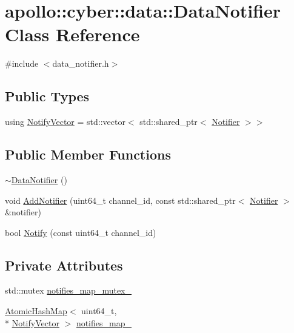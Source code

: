 \hypertarget{classapollo_1_1cyber_1_1data_1_1DataNotifier}{\section{apollo\-:\-:cyber\-:\-:data\-:\-:Data\-Notifier Class Reference}
\label{classapollo_1_1cyber_1_1data_1_1DataNotifier}
}


{\ttfamily \#include $<$data\-\_\-notifier.\-h$>$}

\subsection*{Public Types}
\begin{DoxyCompactItemize}
\item 
using \hyperlink{classapollo_1_1cyber_1_1data_1_1DataNotifier_a32a6a858ae70632d5a6533fb1f16ed2a}{Notify\-Vector} = std\-::vector$<$ std\-::shared\-\_\-ptr$<$ \hyperlink{structapollo_1_1cyber_1_1data_1_1Notifier}{Notifier} $>$$>$
\end{DoxyCompactItemize}
\subsection*{Public Member Functions}
\begin{DoxyCompactItemize}
\item 
\hyperlink{classapollo_1_1cyber_1_1data_1_1DataNotifier_ae1b83ee9238a49eb78876ed5da759c8f}{$\sim$\-Data\-Notifier} ()
\item 
void \hyperlink{classapollo_1_1cyber_1_1data_1_1DataNotifier_a7d08646b3ac8758b2021d24bbc7dabb8}{Add\-Notifier} (uint64\-\_\-t channel\-\_\-id, const std\-::shared\-\_\-ptr$<$ \hyperlink{structapollo_1_1cyber_1_1data_1_1Notifier}{Notifier} $>$ \&notifier)
\item 
bool \hyperlink{classapollo_1_1cyber_1_1data_1_1DataNotifier_a28ae002832e1c7c35a26888b0b5417f9}{Notify} (const uint64\-\_\-t channel\-\_\-id)
\end{DoxyCompactItemize}
\subsection*{Private Attributes}
\begin{DoxyCompactItemize}
\item 
std\-::mutex \hyperlink{classapollo_1_1cyber_1_1data_1_1DataNotifier_a6e73bd4fadc7ed461f4077ea905e50f6}{notifies\-\_\-map\-\_\-mutex\-\_\-}
\item 
\hyperlink{classapollo_1_1cyber_1_1base_1_1AtomicHashMap}{Atomic\-Hash\-Map}$<$ uint64\-\_\-t, \\*
\hyperlink{classapollo_1_1cyber_1_1data_1_1DataNotifier_a32a6a858ae70632d5a6533fb1f16ed2a}{Notify\-Vector} $>$ \hyperlink{classapollo_1_1cyber_1_1data_1_1DataNotifier_acbb98cccf2b075c3c455b9bc2b16013c}{notifies\-\_\-map\-\_\-}
\end{DoxyCompactItemize}


